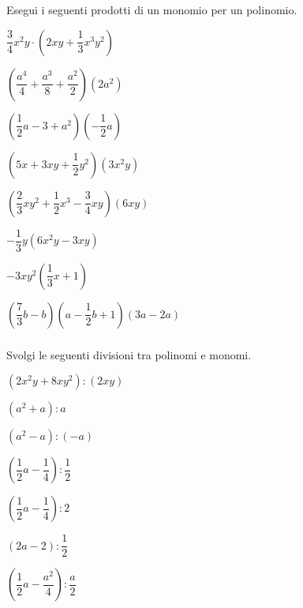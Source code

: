 \begin{esercizio}
\label{ese:10.16}
 Esegui i seguenti prodotti di un monomio per un polinomio.
 \begin{multicols}{2}
\begin{enumeratea}
 \item $\dfrac{3}{4}x^{2}y\cdot\left(2{xy}+\dfrac{1}{3}x^{3}y^{2}\right)$
 \item 
$\left(\dfrac{a^{4}}{4}+\dfrac{a^{3}}{8}+\dfrac{a^{2}}{2}\right)\left(2a^{2}
\right)$
 \item $\left(\dfrac{1}{2}a-3+a^{2}\right)\left(-{\dfrac{1}{2}}a\right)$
 \item $\left(5x+3{xy}+\dfrac{1}{2}y^{2}\right)\left(3x^{2}y\right)$
 \item 
$\left(\dfrac{2}{3}xy^{2}+\dfrac{1}{2}x^{3}-\dfrac{3}{4}{xy}\right)(6{xy})$
 \item $-\dfrac{1}{3}y\left(6x^{2}y-3{xy}\right)$
 \item $-3xy^2\left(\dfrac{1}{3}x+1\right)$
 \item $\left(\dfrac{7}{3}b-b\right)\left(a-\dfrac{1}{2}b+1\right)(3a-2a)$
\end{enumeratea}
\end{multicols}
\end{esercizio}

\subsubsection*{}

\begin{esercizio}
\label{ese:10.17}
 Svolgi le seguenti divisioni tra polinomi e monomi.
 \begin{multicols}{3}
\begin{enumeratea}
 \item $\left(2x^{2}y+8{xy}^{2}\right):\left(2{xy}\right)$
 \item $\left(a^{2}+a\right):a$
 \item $\left(a^{2}-a\right):(-a)$
 \item $\left(\dfrac{1}{2}a-\dfrac{1}{4}\right):\dfrac{1}{2}$
 \item $\left(\dfrac{1}{2}a-\dfrac{1}{4}\right):2$
 \item $(2a-2):\dfrac{1}{2}$
 \item $\left(\dfrac{1}{2}a-\dfrac{a^{2}}{4}\right):\dfrac{a}{2}$
\end{enumeratea}
\end{multicols}
\end{esercizio}


